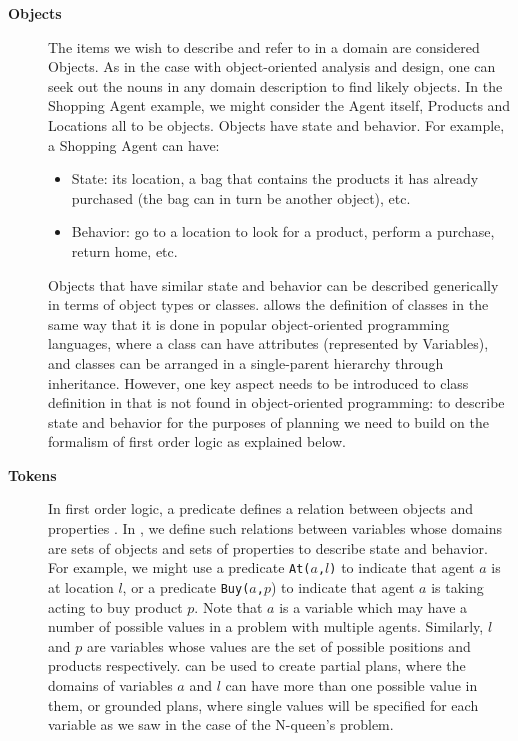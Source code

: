 \begin{description}
\item[\textbf{Objects}] The items we wish to describe and refer to in
  a domain are considered Objects. As in the case with object-oriented
  analysis and design, one can seek out the nouns in any domain
  description to find likely objects. In the Shopping Agent example,
  we might consider the Agent itself, Products and Locations all to be
  objects. Objects have state and behavior. For example, a Shopping
  Agent can have:

  \begin{itemize}

  \item State: its location, a bag that contains the products it has
    already purchased (the bag can in turn be another object), etc.

  \item Behavior: go to a location to look for a product, perform a
    purchase, return home, etc.

  \end{itemize}

  Objects that have similar state and behavior can be
  described generically in terms of object types or classes. \eu
  allows the definition of classes in the same way that it is
  done in popular object-oriented programming languages, where a class 
  can have attributes (represented by Variables), and classes can be arranged in a single-parent hierarchy through inheritance. 
  However, one key aspect needs to be introduced to class definition in \eu that is not found 
  in object-oriented programming:  to describe state and behavior for the purposes of planning we need to
  build on the formalism of first order logic as explained below.

\item[\textbf{Tokens}] In first order logic, a predicate defines a
  relation between objects and properties .  In
  \eu, we define such relations between variables whose domains are
  sets of objects and sets of properties to describe state and
  behavior. For example, we might use a predicate \texttt{At($a$,$l$)}
  to indicate that agent $a$ is at location $l$, or a predicate
  \texttt{Buy($a$,$p$}) to indicate that agent $a$ is taking acting to
  buy product $p$. Note that $a$ is a variable which may have a number
  of possible values in a problem with multiple agents. Similarly, $l$
  and $p$ are variables whose values are the set of possible positions
  and products respectively. \eu can be used to create partial plans,
  where the domains of variables $a$ and $l$ can have more than one
  possible value in them, or grounded plans, where single values will
  be specified for each variable as we saw in the case of the
  N-queen's problem.


\end{description}
